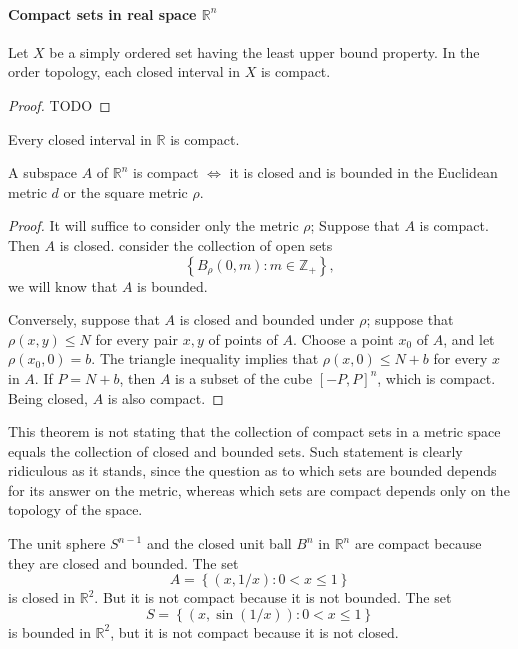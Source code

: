 \paragraph{Compact sets in real space \( \mathbb{R}^n \)}

\begin{theorem}
  Let \( X \) be a simply ordered set having the least upper bound property.
  In the order topology, each closed interval in \( X \) is compact.
\end{theorem}
\begin{proof}
  TODO %
\end{proof}

\begin{corollary}
  Every closed interval in \( \mathbb{R} \) is compact.
\end{corollary}

\begin{theorem}
  A subspace \( A \) of \( \mathbb{R}^n \) is compact \( \iff \) it is closed and is bounded in the Euclidean metric \( d \) or the square metric \( \rho \).
\end{theorem}
\begin{proof}
  It will suffice to consider only the metric \( \rho \);
  Suppose that \( A \) is compact.
  Then \( A \) is closed.
  consider the collection of open sets
  \[
    \left\lbrace B_{\rho}(0, m): m \in \mathbb{Z}_+ \right\rbrace,
  \]
  we will know that \( A \) is bounded.

  Conversely, suppose that \( A \) is closed and bounded under \( \rho \);
  suppose that \( \rho(x, y) \leq N \) for every pair \( x, y \) of points of \( A \).
  Choose a point \( x_0 \) of \( A \), and let \( \rho(x_0, 0) = b \).
  The triangle inequality implies that \( \rho(x, 0) \leq N + b \) for every \( x \) in \( A \).
  If \( P = N + b \), then \( A \) is a subset of the cube \( [-P, P]^n \), which is compact.
  Being closed, \( A \) is also compact.
\end{proof}
\begin{remark}
  This theorem is not stating that the collection of compact sets in a metric space equals the collection of closed and bounded sets.
  Such statement is clearly ridiculous as it stands, since the question as to which sets are bounded depends for its answer on the metric, whereas which sets are compact depends only on the topology of the space.
\end{remark}

\begin{example}
  The unit sphere \( S^{n - 1} \) and the closed unit ball \( B^n \) in \( \mathbb{R}^n \) are compact because they are closed and bounded.
  The set
  \[
    A = \left\lbrace (x, 1/x): 0 < x \leq 1 \right\rbrace
  \]
  is closed in \( \mathbb{R}^2 \).
  But it is not compact because it is not bounded.
  The set
  \[
    S = \left\lbrace (x, \sin(1/x)): 0 < x \leq 1 \right\rbrace
  \]
  is bounded in \( \mathbb{R}^2 \), but it is not compact because it is not closed.
\end{example}

